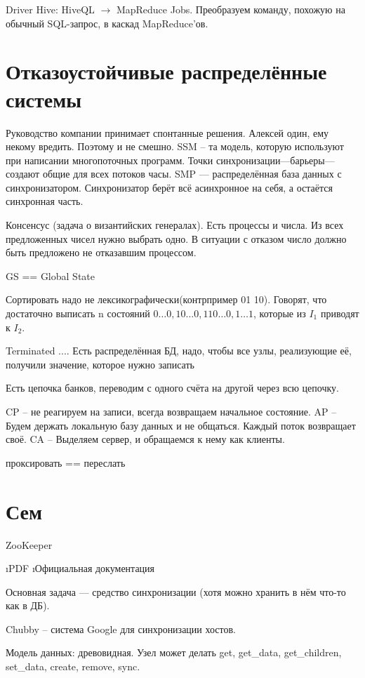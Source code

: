 \begin{enumarate}
Driver Hive: HiveQL $\rightarrow$ MapReduce Jobs.
Преобразуем команду, похожую на обычный SQL-запрос, в каскад MapReduce'ов.


\section{Отказоустойчивые распределённые системы}
Руководство компании принимает спонтанные решения.
Алексей один, ему некому вредить. Поэтому и не смешно.
SSM -- та модель, которую используют при написании многопоточных программ. Точки синхронизации---барьеры--- создают общие для всех потоков часы.
SMP --- распределённая база данных с синхронизатором. Синхронизатор берёт всё асинхронное на себя, а остаётся синхронная часть.

Консенсус (задача о византийских генералах). Есть процессы и числа. Из всех предложенных чисел нужно выбрать одно. В ситуации с отказом число должно быть предложено не отказавшим процессом. 

GS == Global State

Сортировать надо не лексикографически(контрпример 01 10). Говорят, что достаточно выписать n состояний $0\dots0, 10\dots0, 110\dots0, 1\dots1$, которые из $I_1$  приводят к $I_2$. 


Terminated  .... Есть распределённая БД, надо, чтобы все узлы, реализующие её, получили значение, которое нужно записать

Есть цепочка банков, переводим с одного счёта на другой через всю цепочку.

CP -- не реагируем на записи, всегда возвращаем начальное состояние. 
AP -- Будем держать локальную базу данных и не общаться. Каждый поток возвращает своё.
CA -- Выделяем сервер, и обращаемся к нему как клиенты.

проксировать == переслать


\section{Сем}
ZooKeeper
\begin{enumerate}
	\i PDF
	\i Официальная документация
\end{enumerate}

Основная задача --- средство синхронизации (хотя можно хранить в нём что-то как в ДБ).

Chubby -- система Google для синхронизации хостов. 

Модель данных: древовидная.
Узел может делать get, get_data, get_children, set_data, create, remove, sync.


\end{enumarate}
